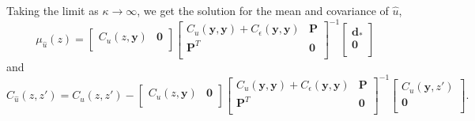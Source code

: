 \documentclass[10pt,a4paper]{article}
\begin{document}
Taking the limit as $\kappa \to \infty$, we get the solution for the mean and covariance of $\hat{u}$,
 \begin{equation}\label{eq:PosteriorMean3}
\mu_{\hat{u}}(z) =
\left[ 
\begin{array}{cc}
C_u(z,\bm{y}) & \bm{0} \\
\end{array}
\right]
\left[
\begin{array}{cc}
C_u(\bm{y},\bm{y}) + C_\epsilon(\bm{y},\bm{y}) & \bm{P} \\
\bm{P}^T  & \bm{0} \\
\end{array}
\right]^{-1}
\left[
\begin{array}{c}
\bm{d}_* \\
\bm{0} \\
\end{array}
\right]
\end{equation}    
and
\begin{equation}\label{eq:PosteriorCov3}
C_{\hat{u}}(z,z') = 
C_u(z,z') - 
\left[ 
\begin{array}{cc}
C_u(z,\bm{y}) & \bm{0} \\
\end{array}
\right]
\left[
\begin{array}{cc}
C_u(\bm{y},\bm{y}) + C_\epsilon(\bm{y},\bm{y}) & \bm{P} \\
\bm{P}^T  & \bm{0} \\
\end{array}
\right]^{-1}
\left[
\begin{array}{c}
C_u(\bm{y},z') \\
\bm{0} \\
\end{array}
\right].
\end{equation}
\end{document}
